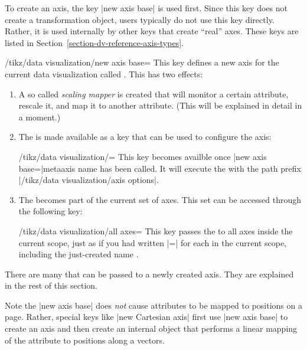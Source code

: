To create an axis, the key |new axis base| is used first. Since this key
does not create a transformation object, users typically do not use
this key directly. Rather, it is used internally by other keys
that create ``real'' axes. These keys are listed in
Section~\ref{section-dv-reference-axis-types}. 

\begin{key}{/tikz/data visualization/new axis base=}
  This key defines a new axis for the current data visualization
  called . This has two effects:
  \begin{enumerate}
  \item A so called \emph{scaling mapper} is created that will monitor
    a certain attribute, rescale it, and map it to another
    attribute. (This will be explained in detail in a moment.)
  \item The  is made available as a key that can be
    used to configure the axis:
    \begin{key}{/tikz/data visualization/=}
      This key becomes availble once |new axis base=|meta{axis name} has
      been called. It will execute the  with the path
      prefix |/tikz/data visualization/axis options|.
\begin{codeexample}
\end{codeexample}
    \end{key}
  \item The  becomes part of the current set of
    axes. This set can be accessed through the following key:
    \begin{key}{/tikz/data visualization/all axes=}
      This key passes the  to all axes inside the
      current scope, just as if you had written |=| for each  in the
      current scope, including the just-created name .
    \end{key}
  \end{enumerate}
  There are many  that can be passed to a newly created
  axis. They are explained in the rest of this section.
\end{key}

Note the |new axis base| does \emph{not} cause attributes to be mapped to
positions on a page. Rather, special keys like |new Cartesian axis|
first use |new axis base| to create an axis and then create an internal
object that performs a linear mapping of the attribute to 
positions along a vectors.


